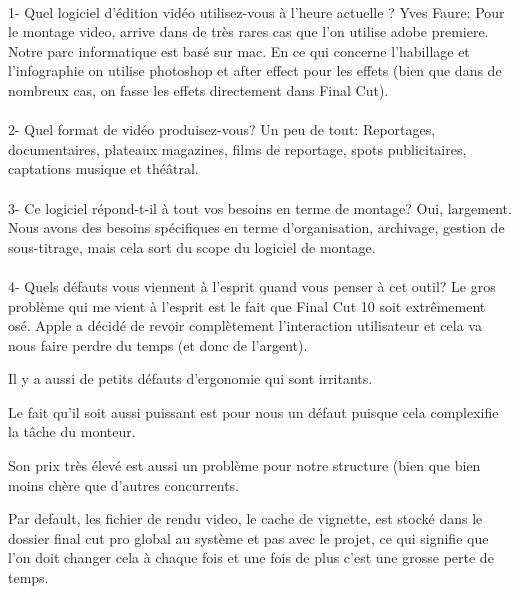 \paragraph{}
1-  Quel logiciel d'édition vidéo utilisez-vous à l'heure actuelle ?
Yves Faure: Pour le montage video, %
arrive dans de très rares cas que l'on utilise adobe premiere. Notre
parc informatique est basé sur mac. En ce qui concerne l'habillage et
l'infographie on utilise photoshop et  after effect pour les effets (bien
que dans de nombreux cas, on fasse les effets directement dans Final Cut).

\paragraph{}
2- Quel format de vidéo produisez-vous?
Un peu de tout: Reportages, documentaires, plateaux magazines, films de reportage, spots
publicitaires, captations musique et théâtral.

\paragraph{}
3- Ce logiciel répond-t-il à tout vos besoins en terme de montage?
Oui, largement. Nous avons des besoins spécifiques en terme d'organisation,
archivage, gestion de sous-titrage, mais cela sort du scope du logiciel de
montage.

\paragraph{}
4- Quels défauts vous viennent à l'esprit quand vous penser à cet outil?
Le gros problème qui me vient à l'esprit est le fait que Final Cut 10 soit
extrêmement osé. Apple a décidé de revoir complètement l'interaction
utilisateur et cela va nous faire perdre du temps (et donc de l'argent). 

Il y a aussi de petits défauts d'ergonomie qui sont irritants.

Le fait qu'il soit aussi puissant est pour nous un défaut puisque cela
complexifie la tâche du monteur.

Son prix très élevé est aussi un problème pour notre structure (bien que bien
moins chère que d'autres concurrents.

Par default, les fichier de rendu video, le cache de vignette, est stocké dans
le dossier final cut pro global au  système et pas avec le projet, ce qui
signifie que l'on doit changer cela à chaque fois et une fois de plus c'est une
grosse perte de temps.

